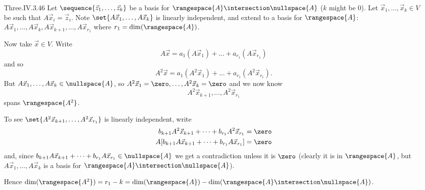 \begin{ans}{Three.IV.3.46}
      \answerasgiven
      Let \( \sequence{\vec{z}_1,\dots,\vec{z}_k} \) be a basis for
      \( \rangespace{A}\intersection\nullspace{A} \)
      (\( k \) might be \( 0 \)).
      Let \( \vec{x}_1,\dots,\vec{x}_k\in V \) be such that
      \( A\vec{x}_i=\vec{z}_i \).
      Note \( \set{A\vec{x}_1,\dots,A\vec{x}_k} \) is linearly independent,
      and extend to a basis for \( \rangespace{A} \):
      \( A\vec{x}_1,\ldots,A\vec{x}_k,A\vec{x}_{k+1},\dots,A\vec{x}_{r_1} \)
      where \( r_1=\dim(\rangespace{A}) \).

      Now take \( \vec{x}\in V \).
      Write
      \begin{equation*}
        A\vec{x}=a_1(A\vec{x}_1)+\dots+a_{r_1}(A\vec{x}_{r_1})
      \end{equation*}
      and so
      \begin{equation*}
        A^2\vec{x}=a_1(A^2\vec{x}_1)+\dots+a_{r_1}(A^2\vec{x}_{r_1}).
      \end{equation*}
      But \( A\vec{x}_1,\dots,A\vec{x}_k\in\nullspace{A} \), so
      \( A^2\vec{x}_1=\zero,\dots,A^2\vec{x}_k=\zero \) and we now know
      \begin{equation*}
        A^2\vec{x}_{k+1},\dots,A^2\vec{x}_{r_1}
      \end{equation*}
      spans \( \rangespace{A^2} \).

      To see \( \set{A^2\vec{x}_{k+1},\dots,A^2\vec{x}_{r_1}} \)
      is linearly independent, write
      \begin{align*}
        b_{k+1}A^2\vec{x}_{k+1}+\dots+b_{r_1}A^2\vec{x}_{r_1}
        &=\zero                                                 \\
        A[b_{k+1}A\vec{x}_{k+1}+\dots+b_{r_1}A\vec{x}_{r_1}]
        &=\zero
      \end{align*}
      and, since
      \( b_{k+1}A\vec{x}_{k+1}+\dots+b_{r_1}A\vec{x}_{r_1}\in\nullspace{A} \)
      we get a contradiction unless it is \( \zero \) (clearly it is in
      \( \rangespace{A} \), but \( A\vec{x}_1,\ldots,A\vec{x}_k \) is a basis
      for \( \rangespace{A}\intersection\nullspace{A} \)).

      Hence \( \dim(\rangespace{A^2})=r_1-k=\dim(\rangespace{A})-
                \dim(\rangespace{A}\intersection\nullspace{A}) \).
    
\end{ans}
